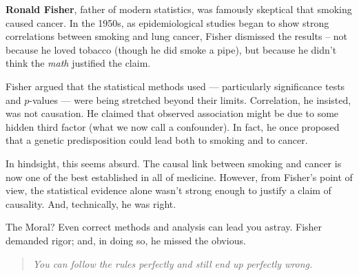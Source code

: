 \begin{tcolorbox}[title={\textbf{Historical Sidebar: Fisher, Smoking, and the Limits of Inference}}, colback=gray!5, colframe=black, fonttitle=\bfseries]

  \textbf{Ronald Fisher}, father of modern statistics, was famously skeptical that smoking caused cancer. In the 1950s, as epidemiological studies began to show strong correlations between smoking and lung cancer, Fisher dismissed the results -- not because he loved tobacco (though he did smoke a pipe), but because he didn’t think the \emph{math} justified the claim.

  \medskip
  
  Fisher argued that the statistical methods used --- particularly significance tests and \( p \)-values --- were being stretched beyond their limits. Correlation, he insisted, was not causation. He claimed that observed association might be due to some hidden third factor (what we now call a confounder). In fact, he once proposed that a genetic predisposition could lead both to smoking and to cancer.
  
  \medskip
  
  In hindsight, this seems absurd. The causal link between smoking and cancer is now one of the best established in all of medicine. However, from Fisher’s point of view, the statistical evidence alone wasn’t strong enough to justify a claim of causality. And, technically, he was right.
  
  \medskip
  
  The Moral? Even correct methods and analysis can lead you astray. Fisher demanded rigor; and, in doing so, he missed the obvious.
  
  \begin{quote}
    \textit{You can follow the rules perfectly and still end up perfectly wrong.}
  \end{quote}
    
  
\end{tcolorbox}
  